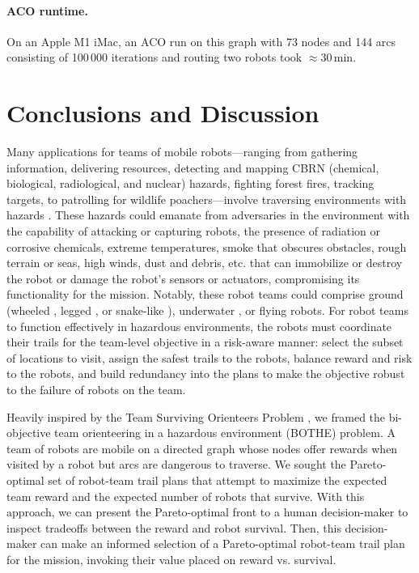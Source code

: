 \documentclass[fleqn,10pt,lineno]{wlpeerj}
\begin{document}
\paragraph{ACO runtime.} On an Apple M1 iMac, an ACO run on this graph with 73 nodes and 144 arcs consisting of 100\,000 iterations and routing two robots took $\approx$30\,min.




\section{Conclusions and Discussion}
Many applications for teams of mobile robots---ranging from gathering information, delivering resources, detecting and mapping CBRN (chemical, biological, radiological, and nuclear) hazards, fighting forest fires, tracking targets, to patrolling for wildlife poachers---involve traversing environments with hazards \cite{trevelyan2016robotics}.
These hazards could emanate from adversaries in the environment with the capability of attacking or capturing robots, the presence of radiation or corrosive chemicals, extreme temperatures, smoke that obscures obstacles, rough terrain or seas, high winds, dust and debris, etc. that can immobilize or destroy the robot or damage the robot's sensors or actuators, compromising its functionality for the mission.
Notably, these robot teams could comprise ground (wheeled \cite{chung2016wheeled}, legged \cite{wieber2016modeling}, or snake-like \cite{walker2016snake}), underwater \cite{choi2016underwater}, or flying \cite{leutenegger2016flying} robots.
For robot teams to function effectively in hazardous environments, the robots must coordinate their trails for the team-level objective in a risk-aware manner: select the subset of locations to visit, assign the safest trails to the robots, balance reward and risk to the robots, and build redundancy into the plans to make the objective robust to the failure of robots on the team. 

Heavily inspired by the Team Surviving Orienteers Problem \cite{jorgensen2018team,jorgensen2017matroid,jorgensen2024matroid}, we framed the bi-objective team orienteering in a hazardous environment (BOTHE) problem.
A team of robots are mobile on a directed graph whose nodes offer rewards when visited by a robot but arcs are dangerous to traverse.
We sought the Pareto-optimal set of robot-team trail plans that attempt to maximize the expected team reward and the expected number of robots that survive. 
With this approach, we can present the Pareto-optimal front to a human decision-maker to inspect tradeoffs between the reward and robot survival. Then, this decision-maker can make an informed selection of a Pareto-optimal robot-team trail plan for the mission, invoking their value placed on reward vs. survival.
\end{document}
